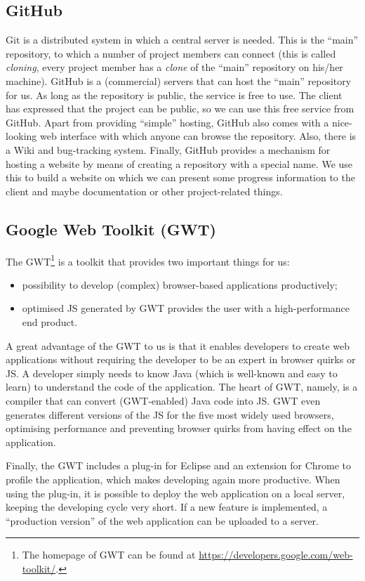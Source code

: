 \subsection{GitHub}
\label{subsec:tools-github}
Git is a distributed system in which a central server is needed. This is the ``main'' repository, to which a number of project members can connect (this is called \emph{cloning}, every project member has a \emph{clone} of the ``main'' repository on his/her machine). GitHub is a (commercial) servers that can host the ``main'' repository for us. As long as the repository is public, the service is free to use. The client has expressed that the project can be public, so we can use this free service from GitHub. Apart from providing ``simple'' hosting, GitHub also comes with a nice-looking web interface with which anyone can browse the repository. Also, there is a Wiki and bug-tracking system. Finally, GitHub provides a mechanism for hosting a website by means of creating a repository with a special name. We use this to build a website on which we can present some progress information to the client and maybe documentation or other project-related things.

\subsection{Google Web Toolkit (GWT)}
\label{subsec:tools-gwt}
The GWT\footnote{The homepage of GWT can be found at \url{https://developers.google.com/web-toolkit/}.} is a toolkit that provides two important things for us:
\begin{itemize}
	\item possibility to develop (complex) browser-based applications productively;
	\item optimised JS generated by GWT provides the user with a high-performance end product.
\end{itemize}
A great advantage of the GWT to us is that it enables developers to create web applications without requiring the developer to be an expert in browser quirks or JS. A developer simply needs to know Java (which is well-known and easy to learn) to understand the code of the application. The heart of GWT, namely, is a compiler that can convert (GWT-enabled) Java code into JS. GWT even generates different versions of the JS for the five most widely used browsers, optimising performance and preventing browser quirks from having effect on the application.

Finally, the GWT includes a plug-in for Eclipse and an extension for Chrome to profile the application, which makes developing again more productive. When using the plug-in, it is possible to deploy the web application on a local server, keeping the developing cycle very short. If a new feature is implemented, a ``production version'' of the web application can be uploaded to a server.

